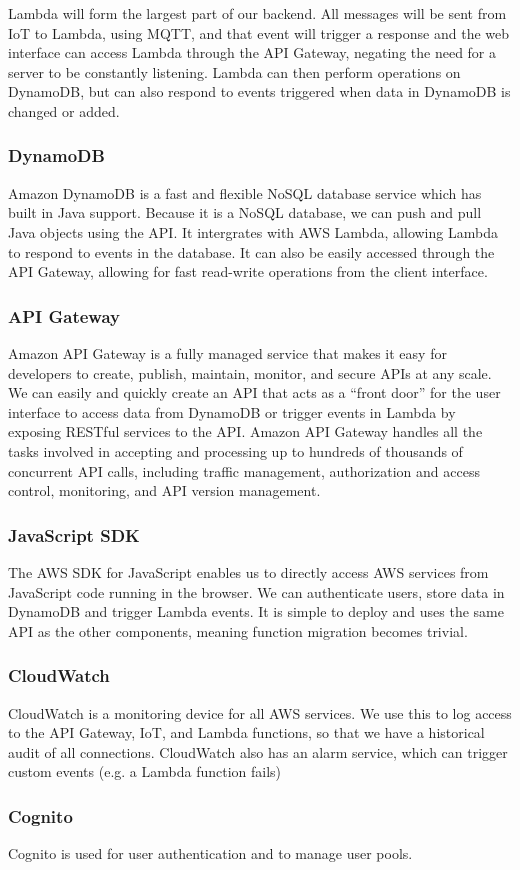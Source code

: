 \documentclass{article}
\begin{document}
		Lambda will form the largest part of our backend. All messages will be sent from IoT to Lambda, using MQTT, and that event will trigger a response and the web interface can access Lambda through the API Gateway, negating the need for a server to be constantly listening. Lambda can then perform operations on DynamoDB, but can also respond to events triggered when data in DynamoDB is changed or added. 
	\subsubsection{DynamoDB}
		Amazon DynamoDB is a fast and flexible NoSQL database service which has built in Java support. Because it is a NoSQL database, we can push and pull Java objects using the API. It intergrates with AWS Lambda, allowing Lambda to respond to events in the database. It can also be easily accessed through the API Gateway, allowing for fast read-write operations from the client interface.
	\subsubsection{API Gateway}
		Amazon API Gateway is a fully managed service that makes it easy for developers to create, publish, maintain, monitor, and secure APIs at any scale. We can easily and quickly create an API that acts as a “front door” for the user interface to access data from DynamoDB or trigger events in Lambda by exposing RESTful services to the API. Amazon API Gateway handles all the tasks involved in accepting and processing up to hundreds of thousands of concurrent API calls, including traffic management, authorization and access control, monitoring, and API version management.
	\subsubsection{JavaScript SDK}
		The AWS SDK for JavaScript enables us to directly access AWS services from JavaScript code running in the browser. We can authenticate users, store data in DynamoDB and trigger Lambda events. It is simple to deploy and uses the same API as the other components, meaning function migration becomes trivial.
	\subsubsection{CloudWatch}
		CloudWatch is a monitoring device for all AWS services. We use this to log access to the API Gateway, IoT, and Lambda functions, so that we have a historical audit of all connections. CloudWatch also has an alarm service, which can trigger custom events (e.g. a Lambda function fails)
	\subsubsection{Cognito}
		Cognito is used for user authentication and to manage user pools.
\end{document}

